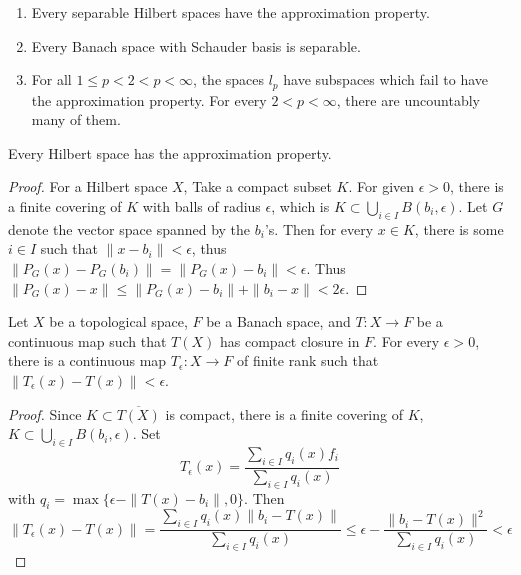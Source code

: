 \begin{exmp} 
\begin{enumerate}
    \item Every separable Hilbert spaces have the approximation property.
    \item Every Banach space with Schauder basis is separable.
    \item For all $1\leq p<2<p<\infty$, the spaces $l_p$ have subspaces which fail to have the approximation property. For every $2<p<\infty$, there are uncountably many of them.
\end{enumerate}
\end{exmp}

\begin{prop} Every Hilbert space has the approximation property.
\end{prop}
\begin{proof} For a Hilbert space $X$, Take a compact subset $K$. For given $\epsilon>0$, there is a finite covering of $K$ with balls of radius $\epsilon$, which is $K\subset \bigcup_{i\in I} B(b_i,\epsilon)$. Let $G$ denote the vector space spanned by the $b_i$'s. Then for every $x\in K$, there is some $i\in I$ such that $\|x-b_i\|<\epsilon$, thus $\|P_G(x)-P_G(b_i)\|=\|P_G(x)-b_i\|<\epsilon$. Thus $\|P_G(x)-x\|\leq \|P_G(x)-b_i\|+\|b_i-x\|<2\epsilon$. 
\end{proof}

\begin{thm} Let $X$ be a topological space, $F$ be a Banach space, and $T:X\rightarrow F$ be a continuous map such that $T(X)$ has compact closure in $F$. For every $\epsilon>0$, there is a continuous map $T_\epsilon:X\rightarrow F$ of finite rank such that $\|T_\epsilon(x)-T(x)\|<\epsilon$.
\end{thm}
\begin{proof}
Since $K\subset \overline{T(X)}$ is compact, there is a finite covering of $K$, $K\subset \bigcup_{i\in I} B(b_i,\epsilon)$. Set
\begin{equation}
    T_\epsilon(x)=\frac{\sum_{i\in I}q_i(x)f_i}{\sum_{i\in I} q_i(x)}
\end{equation}
with $q_i=\max\{\epsilon - \|T(x)-b_i\|,0\}$. Then
\begin{equation}
    \|T_\epsilon(x)-T(x)\|=\frac{\sum_{i\in I}q_i(x)\|b_i-T(x)\|}{\sum_{i\in I}q_i(x)}\leq \epsilon - \frac{\|b_i-T(x)\|^2}{\sum_{i\in I }q_i(x)}<\epsilon
\end{equation}
\end{proof}

